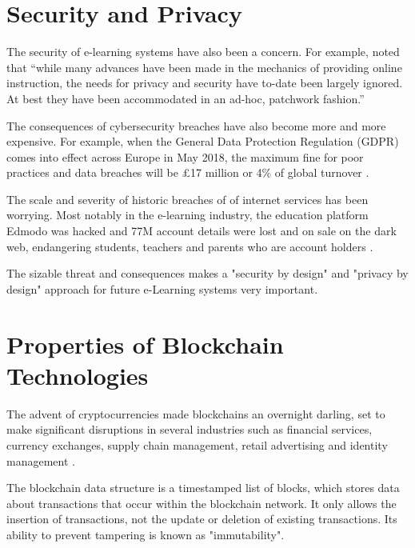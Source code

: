 \section{Security and Privacy}

The security of e-learning systems have also been a concern. For example, \citet{el2003privacy} noted that “while many 
advances have been made in the mechanics of providing online instruction, the needs for privacy and security have to-date 
been largely ignored. At best they have been accommodated in an ad-hoc, patchwork fashion.”

The consequences of cybersecurity breaches have also become more and more expensive. For example, when the General Data 
Protection Regulation (GDPR) comes into effect across Europe in May 2018, the maximum fine for poor practices and data 
breaches will be £17 million or 4\% of global turnover \citep{ico2017gdpr}.

The scale and severity of historic breaches of of internet services has been worrying. Most notably in the e-learning 
industry, the education platform Edmodo was hacked and 77M account details were lost and on sale on the dark 
web, endangering students, teachers and parents who are account holders \citep{opsecmonkey2017edmodo}.

The sizable threat and consequences makes a "security by design" and "privacy by design" approach for future e-Learning 
systems very important.

\section{Properties of Blockchain Technologies}

The advent of cryptocurrencies made blockchains an overnight darling, set to make significant disruptions 
in several industries such as financial services, currency exchanges, supply chain management, retail 
advertising and identity management \citep{forbes2017industries}.

The blockchain data structure is a timestamped list of blocks, which stores data about transactions
that occur within the blockchain network. It only allows the insertion of transactions, not the update 
or deletion of existing transactions. Its ability to prevent tampering is known as "immutability". \citep[p.182]{xu2016blockchain}

